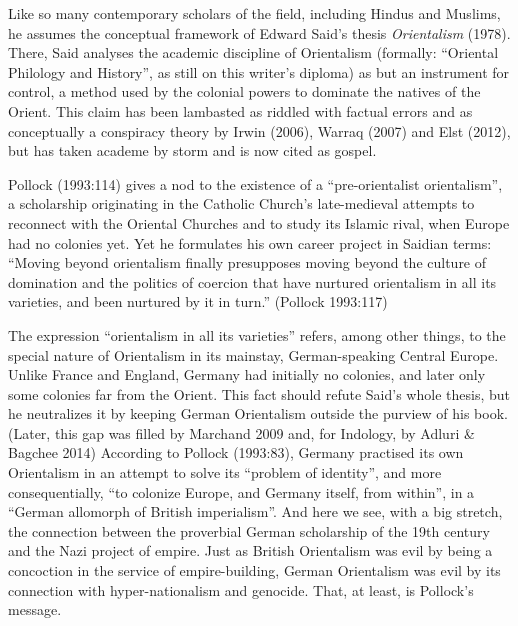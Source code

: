 Like so many contemporary scholars of the field, including Hindus and Muslims, he assumes the conceptual framework of Edward Said’s thesis {\sl Orientalism} (1978). There, Said analyses the academic discipline of Orientalism (formally: “Oriental Philology and History”, as still on this writer’s diploma) as but an instrument for control, a method used by the colonial powers to dominate the natives of the Orient. This claim has been lambasted as riddled with factual errors and as conceptually a conspiracy theory by Irwin (2006), Warraq (2007) and Elst (2012), but has taken academe by storm and is now cited as gospel.

Pollock (1993:114) gives a nod to the existence of a “pre-orientalist orientalism”, a scholarship originating in the Catholic Church’s late-medieval attempts to reconnect with the Oriental Churches and to study its Islamic rival, when Europe had no colonies yet. Yet he formulates his own career project in Saidian terms: “Moving beyond orientalism finally presupposes moving beyond the culture of domination and the politics of coercion that have nurtured orientalism in all its varieties, and been nurtured by it in turn.” (Pollock 1993:117)

The expression “orientalism in all its varieties” refers, among other things, to the special nature of Orientalism in its mainstay, German-speaking Central Europe. Unlike France and England, Germany had initially no colonies, and later only some colonies far from the Orient. This fact should refute Said’s whole thesis, but he neutralizes it by keeping German Orientalism outside the purview of his book. (Later, this gap was filled by Marchand 2009 and, for Indology, by Adluri \& Bagchee 2014) According to Pollock (1993:83), Germany practised its own Orientalism in an attempt to solve its “problem of identity”, and more consequentially, “to colonize Europe, and Germany itself, from within”, in a “German allomorph of British imperialism”. And here we see, with a big stretch, the connection between the proverbial German scholarship of the 19th century and the Nazi project of empire. Just as British Orientalism was evil by being a concoction in the service of empire-building, German Orientalism was evil by its connection with hyper-nationalism and genocide. That, at least, is Pollock’s message.

